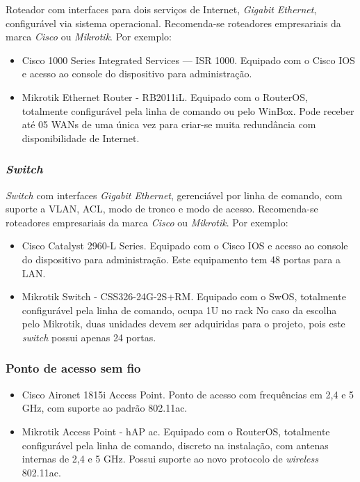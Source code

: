 \documentclass[	DIV=calc,%
							paper=a4,%
							fontsize=12pt,%
							onecolumn]{scrartcl}	 					%
\begin{document}
Roteador com interfaces para dois serviços de Internet, \textit{Gigabit Ethernet}, configurável via sistema operacional. Recomenda-se roteadores empresariais da marca \textit{Cisco} ou \textit{Mikrotik}. Por exemplo:

\begin{itemize}
\item{Cisco 1000 Series Integrated Services --- ISR 1000}. Equipado com o Cisco IOS e acesso ao console do dispositivo para administração.
\item{Mikrotik Ethernet Router - RB2011iL}. Equipado com o RouterOS, totalmente configurável pela linha de comando ou pelo WinBox. Pode receber até 05 WANs de uma única vez para criar-se muita redundância com disponibilidade de Internet. 
\end{itemize}

\subsubsection{\textit{Switch}}

\textit{Switch} com interfaces \textit{Gigabit Ethernet}, gerenciável por linha de comando, com suporte a VLAN, ACL, modo de tronco e modo de acesso. Recomenda-se roteadores empresariais da marca \textit{Cisco} ou \textit{Mikrotik}. Por exemplo:

\begin{itemize}
	\item{Cisco Catalyst 2960-L Series}. Equipado com o Cisco IOS e acesso ao console do dispositivo para administração. Este equipamento tem 48 portas para a LAN.
	\item{Mikrotik Switch - CSS326-24G-2S+RM}. Equipado com o SwOS, totalmente configurável pela linha de comando, ocupa 1U no rack No caso da escolha pelo Mikrotik, duas unidades devem ser adquiridas para o projeto, pois este \textit{switch} possui apenas 24 portas. 
\end{itemize}

\subsubsection{Ponto de acesso sem fio}
\begin{itemize}
	\item{Cisco Aironet 1815i Access Point}. Ponto de acesso com frequências em 2,4 e 5 GHz, com suporte ao padrão 802.11ac.
	\item{Mikrotik Access Point - hAP ac}. Equipado com o RouterOS, totalmente configurável pela linha de comando, discreto  na instalação, com antenas internas de 2,4 e 5 GHz. Possui suporte ao novo protocolo de \textit{wireless} 802.11ac.  
\end{itemize}
\end{document}
